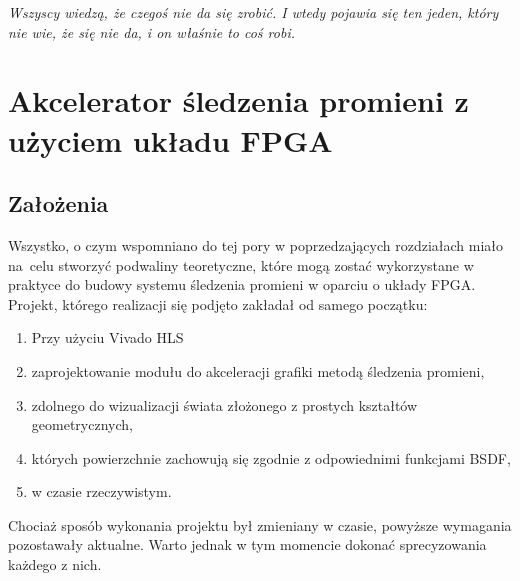 \begin{savequote}[1\textwidth]
\begin{flushright} 
\begin{minipage}[!h]{9.8cm}
{\itshape {Wszyscy wiedzą, że czegoś nie da się zrobić. I wtedy pojawia się ten jeden, który nie wie, że się nie da, i on właśnie to coś robi.}}
\end{minipage}
\end{flushright} 
\end{savequote}

\chapter{Akcelerator śledzenia promieni z użyciem układu FPGA}




\section{Założenia}
Wszystko, o czym wspomniano do tej pory w poprzedzających rozdziałach miało na~celu stworzyć podwaliny teoretyczne, które mogą zostać wykorzystane w praktyce do budowy systemu śledzenia promieni w oparciu o układy FPGA. Projekt, którego realizacji się podjęto zakładał od samego początku:
\begin{enumerate}
\item Przy użyciu Vivado HLS
\item zaprojektowanie modułu do akceleracji grafiki metodą śledzenia promieni,
\item zdolnego do wizualizacji świata złożonego z prostych kształtów geometrycznych,
\item których powierzchnie zachowują się zgodnie z odpowiednimi funkcjami BSDF,
\item w czasie rzeczywistym.
\end{enumerate}

Chociaż sposób wykonania projektu był zmieniany w czasie, powyższe wymagania pozostawały aktualne. Warto jednak w tym momencie dokonać sprecyzowania każdego z nich.

